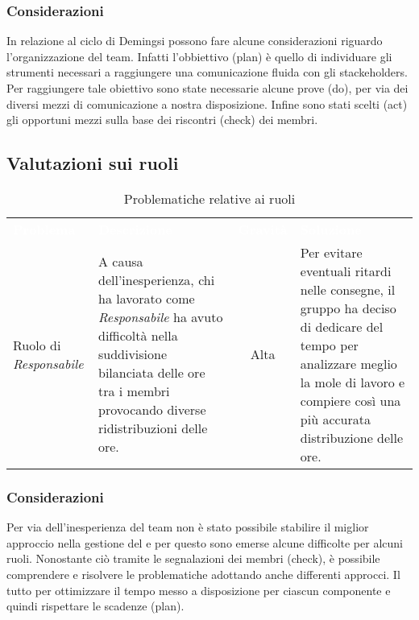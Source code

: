 \subsubsection{Considerazioni}
In relazione al ciclo di Deming\glo si possono fare alcune considerazioni riguardo l'organizzazione del team.
Infatti l'obbiettivo (plan) è quello di individuare gli strumenti necessari a raggiungere una comunicazione fluida con gli stackeholders. Per raggiungere tale obiettivo sono state necessarie alcune prove (do), per via dei diversi mezzi di comunicazione a nostra disposizione. Infine sono stati scelti (act) gli opportuni mezzi sulla base dei riscontri (check) dei membri.

\pagebreak

\subsection{Valutazioni sui ruoli}

\begin{table}[H]
\caption{Problematiche relative ai ruoli}
\begin{center}
\begin{tabular}{ C{2.5cm} L{5cm} c L{5.5cm} }
\textcolor{white}{\textbf{Problema}} & \centerline{\textcolor{white}{\textbf{Descrizione}}} & \textcolor{white}{\textbf{Gravità}} & \centerline{\textcolor{white}{\textbf{Soluzione}}}\\
Ruolo di \textit{Responsabile} & A causa dell'inesperienza, chi ha lavorato come \textit{Responsabile} ha avuto difficoltà nella suddivisione bilanciata delle ore tra i membri provocando diverse ridistribuzioni delle ore. & Alta & Per evitare eventuali ritardi nelle consegne, il gruppo ha deciso di dedicare del tempo per analizzare meglio la mole di lavoro e compiere così una più accurata distribuzione delle ore. \\
\end{tabular}
\end{center}
\end{table}

\subsubsection{Considerazioni}
Per via dell'inesperienza del team non è stato possibile stabilire  il miglior approccio nella gestione del e per questo sono emerse alcune difficolte per alcuni ruoli. Nonostante ciò tramite le segnalazioni dei membri (check), è possibile comprendere e risolvere le problematiche adottando anche differenti approcci. Il tutto per ottimizzare il tempo messo a disposizione per ciascun componente e quindi rispettare le scadenze (plan).

